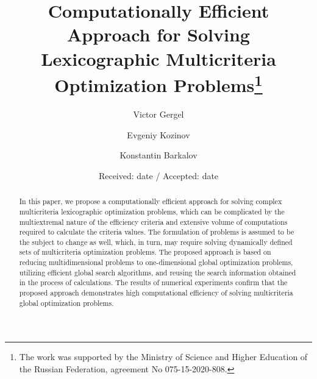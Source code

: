 \documentclass[smallextended]{svjour3}       %
\begin{document}
\title{Computationally Efficient Approach for Solving Lexicographic Multicriteria Optimization Problems\thanks{The work was supported by the Ministry of Science and Higher Education of the Russian Federation, agreement No 075-15-2020-808. %
}
}


\author{Victor Gergel %
\and
Evgeniy Kozinov
\and
Konstantin Barkalov
}



\date{Received: date / Accepted: date}

\maketitle

\begin{abstract}
In this paper, we propose a computationally efficient approach for solving complex multicriteria lexicographic optimization problems, which can be complicated by the multiextremal nature of the efficiency criteria and extensive volume of computations required to calculate the criteria values. The formulation of problems is assumed to be the subject to change as well, which, in turn, may require solving dynamically defined sets of multicriteria optimization problems. The proposed approach is based on reducing multidimensional problems to one-dimensional global optimization problems, utilizing efficient global search algorithms, and reusing the search information obtained in the process of calculations. The results of numerical experiments confirm that the proposed approach demonstrates high computational efficiency of solving multicriteria global optimization problems.
\end{abstract}
\end{document}
